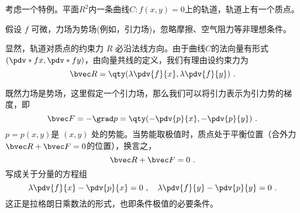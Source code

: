 考虑一个特例。平面$R^2$内一条曲线$C:f(x,y)=0$上的轨道，轨道上有一个质点。

假设 $f$ 可微，力场为势场(例如，引力场)，忽略摩擦、空气阻力等非理想条件。

显然，轨道对质点的约束力 $R$ 必沿法线方向。由于曲线$C$的法向量有形式 $(\pdv*{f}{x},\pdv*{f}{y})$，由向量共线的定义，我们有理由设约束力为
\begin{equation}
\bvec R = \qty(\lambda\pdv{f}{x},\lambda\pdv{f}{y})~.
\end{equation}

既然力场是势场，这里假定一个引力场，那么我们可以将引力表示为引力势的梯度，即
\begin{equation}
\bvec F = -\grad p = \qty(-\pdv{p}{x},-\pdv{p}{y})~.
\end{equation}
$p=p(x,y)$是 $(x,y)$ 处的势能。当势能取极值时，质点处于平衡位置（合外力$\bvec R+\bvec F=0$的位置），换言之，
\begin{equation}
\bvec R + \bvec F = 0 ~.
\end{equation}
写成关于分量的方程组
\begin{equation}
\lambda\pdv{f}{x}  -\pdv{p}{x} = 0~, \quad
\lambda\pdv{f}{y}  -\pdv{p}{y} = 0 ~.
\end{equation}
这正是拉格朗日乘数法的形式，也即条件极值的必要条件。
